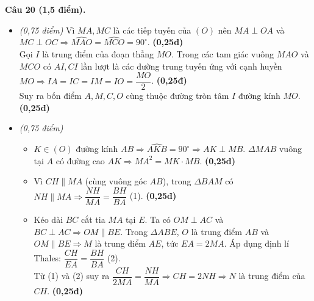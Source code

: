 \documentclass[11pt,a4paper]{article}
\begin{document}
\vspace{1mm}
\textbf{Câu 20 (1,5 điểm).}
\begin{itemize}
  \item[a)] \textit{(0,75 điểm)} Vì $MA, MC$ là các tiếp tuyến của $(O)$ nên $MA \perp OA$ và $MC \perp OC \Rightarrow \widehat{MAO} = \widehat{MCO} = 90^\circ$. \hfill \textbf{(0,25đ)}\\
  Gọi $I$ là trung điểm của đoạn thẳng $MO$. Trong các tam giác vuông $MAO$ và $MCO$ có $AI, CI$ lần lượt là các đường trung tuyến ứng với cạnh huyền $MO \Rightarrow IA = IC = IM = IO = \dfrac{MO}{2}$. \hfill \textbf{(0,25đ)}\\
  Suy ra bốn điểm $A, M, C, O$ cùng thuộc đường tròn tâm $I$ đường kính $MO$. \hfill \textbf{(0,25đ)}

  \item[b)] \textit{(0,75 điểm)}
  \begin{itemize}
    \item $K \in (O)$ đường kính $AB \Rightarrow \widehat{AKB} = 90^\circ \Rightarrow AK \perp MB$. $\Delta MAB$ vuông tại $A$ có đường cao $AK \Rightarrow MA^2 = MK \cdot MB$. \hfill \textbf{(0,25đ)}
    \item Vì $CH \parallel MA$ (cùng vuông góc $AB$), trong $\Delta BAM$ có $NH \parallel MA \Rightarrow \dfrac{NH}{MA} = \dfrac{BH}{BA}$ (1). \hfill \textbf{(0,25đ)}
    \item Kéo dài $BC$ cắt tia $MA$ tại $E$. Ta có $OM \perp AC$ và $BC \perp AC \Rightarrow OM \parallel BE$. Trong $\Delta ABE$, $O$ là trung điểm $AB$ và $OM \parallel BE \Rightarrow M$ là trung điểm $AE$, tức $EA = 2MA$. Áp dụng định lí Thales: $\dfrac{CH}{EA} = \dfrac{BH}{BA}$ (2).\\
    Từ (1) và (2) suy ra $\dfrac{CH}{2MA} = \dfrac{NH}{MA} \Rightarrow CH = 2NH \Rightarrow N$ là trung điểm của $CH$. \hfill \textbf{(0,25đ)}
  \end{itemize}
\end{itemize}
\end{document}
